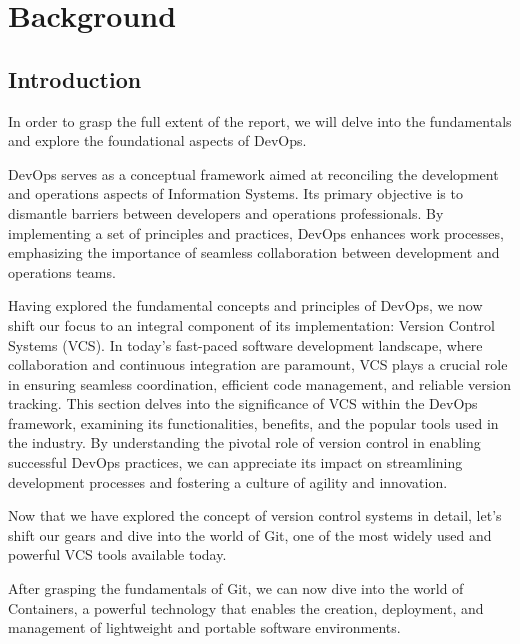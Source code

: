 \chapter{Background}

\section*{Introduction}
In order to grasp the full extent of the report, we will delve into the fundamentals and explore the foundational aspects of DevOps.

DevOps serves as a conceptual framework aimed at reconciling the development and operations aspects of Information Systems. Its primary objective is to dismantle barriers between developers and operations professionals. By implementing a set of principles and practices, DevOps enhances work processes, emphasizing the importance of seamless collaboration between development and operations teams.\cite{diel2016communication}

Having explored the fundamental concepts and principles of DevOps, we now shift our focus to an integral component of its implementation: Version Control Systems (VCS). In today's fast-paced software development landscape, where collaboration and continuous integration are paramount, VCS plays a crucial role in ensuring seamless coordination, efficient code management, and reliable version tracking. This section delves into the significance of VCS within the DevOps framework, examining its functionalities, benefits, and the popular tools used in the industry. By understanding the pivotal role of version control in enabling successful DevOps practices, we can appreciate its impact on streamlining development processes and fostering a culture of agility and innovation.



Now that we have explored the concept of version control systems in detail, let's shift our gears and dive into the world of Git, one of the most widely used and powerful VCS tools available today.



After grasping the fundamentals of Git, we can now dive into the world of Containers, a powerful technology that enables the creation, deployment, and management of lightweight and portable software environments.

